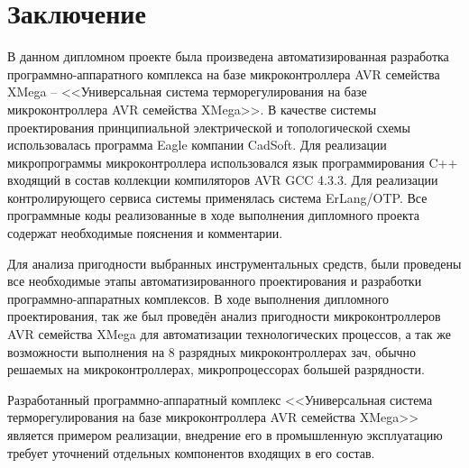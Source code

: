 \section*{Заключение}

В данном дипломном проекте была произведена автоматизированная разработка программно-аппаратного
комплекса на базе микроконтроллера AVR семейства XMega -- <<Универсальная система терморегулирования
на базе микроконтроллера AVR семейства XMega>>. В качестве системы проектирования принципиальной электрической
и топологической схемы использовалась программа Eagle компании CadSoft. Для реализации микропрограммы
микроконтроллера использовался язык программирования C++ входящий в состав коллекции компиляторов AVR GCC 4.3.3.
Для реализации контролирующего сервиса системы применялась система ErLang/OTP. Все программные коды
реализованные в ходе выполнения дипломного проекта содержат необходимые пояснения и комментарии.

Для анализа пригодности выбранных инструментальных средств, 
были проведены все необходимые этапы автоматизированного проектирования и разработки
программно-аппаратных комплексов. В ходе выполнения дипломного проектирования, так же был
проведён анализ пригодности микроконтроллеров AVR семейства XMega для автоматизации
технологических процессов, а так же возможности выполнения на 8 разрядных микроконтроллерах
зач, обычно решаемых на микроконтроллерах, микропроцессорах большей разрядности.

Разработанный программно-аппаратный комплекс <<Универсальная система терморегулирования на базе микроконтроллера
AVR семейства XMega>> является примером реализации, внедрение его в промышленную эксплуатацию
требует уточнений отдельных компонентов входящих в его состав.
